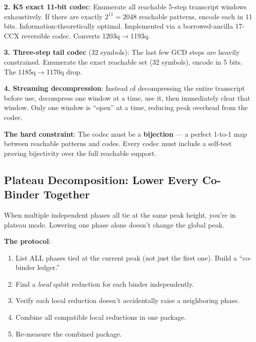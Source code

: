 \documentclass[11pt,a4paper]{article}
\begin{document}
\textbf{2. K5 exact 11-bit codec}: Enumerate all reachable 5-step transcript windows
exhaustively. If there are exactly $2^{11} = 2048$ reachable patterns, encode each in 11 bits.
Information-theoretically optimal. Implemented via a borrowed-ancilla 17-CCX reversible codec.
Converts 1203q$\to$1193q.

\textbf{3. Three-step tail codec} (32 symbols): The last few GCD steps are heavily constrained.
Enumerate the exact reachable set (32 symbols), encode in 5 bits. The 1185q$\to$1170q drop.

\textbf{4. Streaming decompression}: Instead of decompressing the entire transcript before use,
decompress one window at a time, use it, then immediately clear that window. Only one window is
``open'' at a time, reducing peak overhead from the codec.

\textbf{The hard constraint}: The codec must be a \textbf{bijection} --- a perfect 1-to-1 map
between reachable patterns and codes. Every codec must include a self-test proving bijectivity over
the full reachable support.

\subsection{Plateau Decomposition: Lower Every Co-Binder Together}

When multiple independent phases all tie at the same peak height, you're in plateau mode.
Lowering one phase alone doesn't change the global peak.

\textbf{The protocol}:
\begin{enumerate}
  \item List ALL phases tied at the current peak (not just the first one). Build a ``co-binder ledger.''
  \item Find a \emph{local} qubit reduction for each binder independently.
  \item Verify each local reduction doesn't accidentally raise a neighboring phase.
  \item Combine all compatible local reductions in one package.
  \item Re-measure the combined package.
\end{enumerate}
\end{document}
